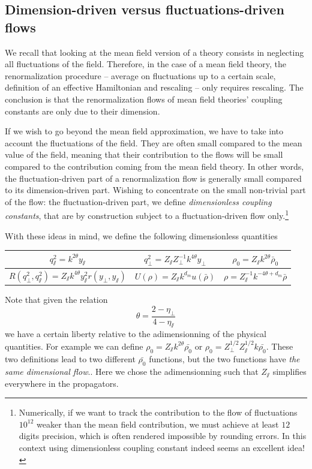 \subsection{Dimension-driven versus fluctuations-driven flows}
We recall that looking at the mean field version of a theory consists in neglecting all fluctuations of the field. Therefore, in the case of a mean field theory, the renormalization procedure -- average on fluctuations up to a certain scale, definition of an effective Hamiltonian and rescaling -- only requires rescaling. 
The conclusion is that the renormalization flows of mean field theories' coupling constants are only due to their dimension.

If we wish to go beyond the mean field approximation, we have to take into account the fluctuations of the field.
They are often small compared to the mean value of the field, meaning that their contribution to the flows will be small compared to the contribution coming from the mean field theory. In other words, the fluctuation-driven part of a renormalization flow is generally small compared to its dimension-driven part. 
Wishing to concentrate on the small non-trivial part of the flow: the fluctuation-driven part, we define \textit{dimensionless coupling constants}, that are by construction subject to a fluctuation-driven flow only.\footnote{Numerically, if we want to track the contribution to the flow of fluctuations $10^{12}$ weaker than the mean field contribution, we must achieve at least $12$ digits precision, which is often rendered impossible by rounding errors. In this context using dimensionless coupling constant indeed seems an excellent idea!}

With these ideas in mind, we define the following dimensionless quantities 


\begin{center}
\begin{tabular}{|c|c|c|}
\hline
$q_\sslash^2 = k^{2 \theta} y_\sslash$ & $q_\perp^2 = Z_\sslash Z_\perp^{-1} k^{4\theta} y_\perp$ & $\rho_0 = Z_\sslash k^{2\theta} \bar \rho_0$\\ 
\hline 
$R(q_\perp^2,q_\sslash^2) = Z_\sslash k^{4\theta} y_\sslash^2 r(y_\perp, y_\sslash)$ & $U(\rho) = Z_\sslash k^{d_m} u(\bar{\rho})$ & $\rho = Z_\sslash^{-1} k^{-4\theta + d_m} \bar{\rho}$ \\ 
\hline 
\end{tabular}
\end{center}

Note that given the relation
\begin{equation}
\theta = \frac{2-\eta_\perp}{4-\eta_\sslash}
\end{equation}
we have a certain liberty relative to the adimensionning of the physical quantities. For example we can define $\rho_0 = Z_\sslash k^{2\theta} \bar{\rho_0}$ or $\rho_0 = Z_\perp^{1/2}Z_\sslash^{1/2}k\bar{\rho_0}$. These two definitions lead to two different $\bar{\rho_0}$ functions, but the two functions have \textit{the same dimensional flow}.. Here we chose the adimensionning such that $Z_\sslash$ simplifies everywhere in the propagators. 

